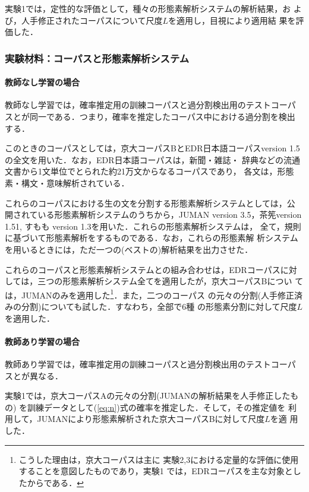 実験1では，定性的な評価として，種々の形態素解析システムの解析結果，お
よび，人手修正されたコーパスについて尺度$L$を適用し，目視により適用結
果を評価した．

\subsubsection*{実験材料：コーパスと形態素解析システム}

\paragraph{教師なし学習の場合}

教師なし学習では，確率推定用の訓練コーパスと過分割検出用のテストコーパ
スとが同一である．つまり，確率を推定したコーパス中における過分割を検出
する．

このときのコーパスとしては，京大コーパスBとEDR日本語コーパスversion
1.5\cite{edr95}の全文を用いた．なお，EDR日本語コーパスは，新聞・雑誌・
辞典などの流通文書から1文単位でとられた約21万文からなるコーパスであり，
各文は，形態素・構文・意味解析されている．

これらのコーパスにおける生の文を分割する形態素解析システムとしては，公
開されている形態素解析システムのうちから，JUMAN version
3.5\cite{kurohashi97}，茶筅version 1.51\cite{matsumoto97}, すもも
version 1.3\cite{washizaka97}を用いた．これらの形態素解析システムは，
全て，規則に基づいて形態素解析をするものである．なお，これらの形態素解
析システムを用いるときには，ただ一つの(ベストの)解析結果を出力させた．

これらのコーパスと形態素解析システムとの組み合わせは，EDRコーパスに対
しては，三つの形態素解析システム全てを適用したが，京大コーパスBについ
ては，JUMANのみを適用した\footnote{こうした理由は，京大コーパスは主に
  実験2,3における定量的な評価に使用することを意図したものであり，実験1
  では，EDRコーパスを主な対象としたからである．}．また，二つのコーパス
の元々の分割(人手修正済みの分割)についても試した．すなわち，全部で6種
の形態素分割に対して尺度$L$を適用した．

\paragraph{教師あり学習の場合}

教師あり学習では，確率推定用の訓練コーパスと過分割検出用のテストコーパ
スとが異なる．

実験1では，京大コーパスAの元々の分割(JUMANの解析結果を人手修正したもの)
を訓練データとして(\ref{eq:n})式の確率を推定した．そして，その推定値を
利用して，JUMANにより形態素解析された京大コーパスBに対して尺度$L$を適
用した．

